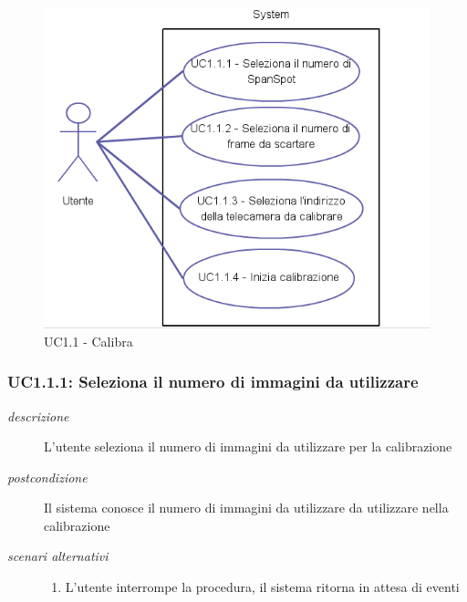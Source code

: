 \begin{figure}[htpb] 

\centering 

\includegraphics[scale=0.4]{./images/uc11.png} 

\caption{UC1.1 - Calibra} 

\label{fig:uc1.1}

\end{figure} 

\subsubsection{UC1.1.1: Seleziona il numero di immagini da utilizzare} \label{sec:UC1.1.1}
\begin{description}
\item[\em{descrizione }]L'utente seleziona il numero di immagini da utilizzare per la calibrazione
\item[\em{postcondizione }] Il sistema conosce il numero di immagini da utilizzare da utilizzare nella calibrazione
\item[\em{scenari alternativi }] \mbox{}

  \begin{enumerate}
\item L'utente interrompe la procedura, il sistema ritorna in attesa di eventi
\end{enumerate}
\end{description}

